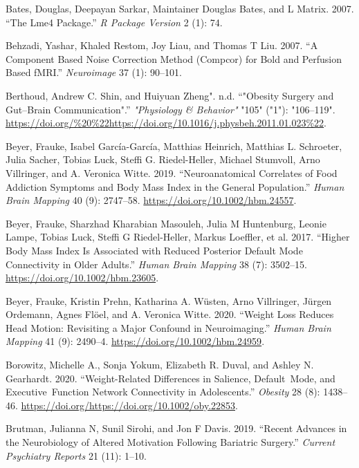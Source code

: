 \documentclass[
]{article}
\begin{document}
\leavevmode\hypertarget{ref-Bates_2007}{}%
Bates, Douglas, Deepayan Sarkar, Maintainer Douglas Bates, and L Matrix. 2007. ``The Lme4 Package.'' \emph{R Package Version} 2 (1): 74.

\leavevmode\hypertarget{ref-Behzadi_2007}{}%
Behzadi, Yashar, Khaled Restom, Joy Liau, and Thomas T Liu. 2007. ``A Component Based Noise Correction Method (Compcor) for Bold and Perfusion Based fMRI.'' \emph{Neuroimage} 37 (1): 90--101.

\leavevmode\hypertarget{ref-Berthoud_2011}{}%
Berthoud, Andrew C. Shin, and Huiyuan Zheng". n.d. ``"Obesity Surgery and Gut--Brain Communication".'' \emph{"Physiology \& Behavior"} "105" ("1"): "106--119". \url{https://doi.org/\%20\%22https://doi.org/10.1016/j.physbeh.2011.01.023\%22}.

\leavevmode\hypertarget{ref-Beyer_2019}{}%
Beyer, Frauke, Isabel García-García, Matthias Heinrich, Matthias L. Schroeter, Julia Sacher, Tobias Luck, Steffi G. Riedel-Heller, Michael Stumvoll, Arno Villringer, and A. Veronica Witte. 2019. ``Neuroanatomical Correlates of Food Addiction Symptoms and Body Mass Index in the General Population.'' \emph{Human Brain Mapping} 40 (9): 2747--58. \url{https://doi.org/10.1002/hbm.24557}.

\leavevmode\hypertarget{ref-Beyer_2017}{}%
Beyer, Frauke, Sharzhad Kharabian Masouleh, Julia M Huntenburg, Leonie Lampe, Tobias Luck, Steffi G Riedel-Heller, Markus Loeffler, et al. 2017. ``Higher Body Mass Index Is Associated with Reduced Posterior Default Mode Connectivity in Older Adults.'' \emph{Human Brain Mapping} 38 (7): 3502--15. \url{https://doi.org/10.1002/hbm.23605}.

\leavevmode\hypertarget{ref-Beyer_2020}{}%
Beyer, Frauke, Kristin Prehn, Katharina A. Wüsten, Arno Villringer, Jürgen Ordemann, Agnes Flöel, and A. Veronica Witte. 2020. ``Weight Loss Reduces Head Motion: Revisiting a Major Confound in Neuroimaging.'' \emph{Human Brain Mapping} 41 (9): 2490--4. \url{https://doi.org/10.1002/hbm.24959}.

\leavevmode\hypertarget{ref-Borowitz_2020}{}%
Borowitz, Michelle A., Sonja Yokum, Elizabeth R. Duval, and Ashley N. Gearhardt. 2020. ``Weight-Related Differences in Salience, Default~Mode, and Executive~Function Network Connectivity in Adolescents.'' \emph{Obesity} 28 (8): 1438--46. \url{https://doi.org/https://doi.org/10.1002/oby.22853}.

\leavevmode\hypertarget{ref-Brutman_2019}{}%
Brutman, Julianna N, Sunil Sirohi, and Jon F Davis. 2019. ``Recent Advances in the Neurobiology of Altered Motivation Following Bariatric Surgery.'' \emph{Current Psychiatry Reports} 21 (11): 1--10.
\end{document}
